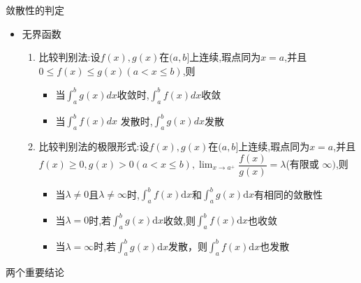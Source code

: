 \documentclass[8pt a4paper, oneside, UTF8]{ctexbook}  %
\begin{document}
\begin{sloppypar}
\begin{criterion}{敛散性的判定}{}
\begin{itemize}
\begin{enumerate}
                  \end{enumerate}
            \item 无界函数
                  \begin{enumerate}
                      \item 比较判别法:设$f(x),g(x)$在$(a,b]$上连续,瑕点同为$x=a$,并且$0\leqslant f(x)\leqslant g(x)(a<x\leqslant b)$,则
                            \begin{itemize}
                                \item 当$\int_{a}^{b}g(x) dx$收敛时,$\int_a^{b}f(x) dx$收敛
                                \item 当$\int_{a}^{b}f(x) dx$ 发散时,$\int_a^{b}g(x) dx$发散
                            \end{itemize}
                      \item 比较判别法的极限形式:设$f(x),g(x)$在$(a,b]$上连续,瑕点同为$x=a$,并且$f(x)\geqslant0,g(x)>0(a<x\leqslant b),\lim_{x\to a^{+}}\dfrac{f(x)}{g(x)}=\lambda$(有限或 $\infty)$,则
                            \begin{itemize}
                                \item 当$\lambda\neq0$且$\lambda\neq\infty$时,$\int_{a}^{b}f(x)\mathrm{d}x$和$\int_{a}^{b}g(x)\mathrm{d}x$有相同的敛散性
                                \item 当$\lambda=0$时,若$\int_{a}^{b}g(x)\mathrm{d}x$收敛,则$\int_{a}^{b}f(x)\mathrm{d}x$也收敛
                                \item 当$\lambda=\infty$时,若$\int_{a}^{b}g(x)\mathrm{d}x$发散，则$\int_{a}^{b}f(x)\mathrm{d}x$也发散
                            \end{itemize}
                  \end{enumerate}
        \end{itemize}
    \end{criterion}
    \begin{conclusion}{两个重要结论}{}
\end{conclusion}
\end{sloppypar}
\end{document}
